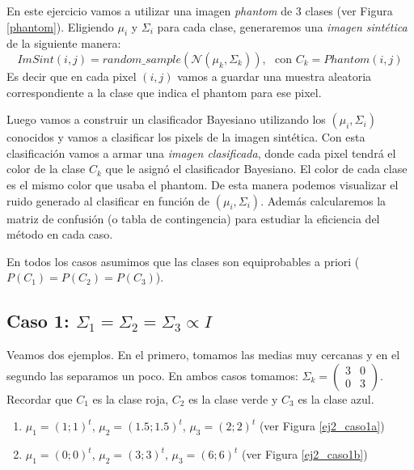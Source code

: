 \documentclass[a4paper,11pt]{article}
\begin{document}
En este ejercicio vamos a utilizar una imagen \emph{phantom} de 3 clases (ver Figura \ref{phantom}). Eligiendo $\mu_i$ y $\Sigma_i$ para cada clase,
generaremos una \emph{imagen sintética} de la siguiente manera:
$$ ImSint(i,j) = random\_sample(\mathcal{N}(\mu_k, \Sigma_k)), \ \ \ \text{con } C_k = Phantom(i,j)$$
Es decir que en cada pixel $(i,j)$ vamos a guardar una muestra aleatoria correspondiente a la clase que indica el phantom para ese pixel.

Luego vamos a construir un clasificador Bayesiano utilizando los $(\mu_i, \Sigma_i)$ conocidos y vamos a clasificar los pixels de la imagen sintética.
Con esta clasificación vamos a armar una \emph{imagen clasificada}, donde cada pixel tendrá el color de la clase $C_k$ que le asignó el clasificador Bayesiano. El color de cada clase es el mismo color que usaba el phantom. De esta manera podemos visualizar el ruido generado al clasificar en función de $(\mu_i, \Sigma_i)$. Además calcularemos la matriz de confusión (o tabla de contingencia) para estudiar la eficiencia del método en cada caso.

En todos los casos asumimos que las clases son equiprobables a priori ($P(C_1) = P(C_2) = P(C_3)$).

\subsection*{Caso 1: $\Sigma_1 = \Sigma_2 = \Sigma_3 \propto I$}
Veamos dos ejemplos. En el primero, tomamos las medias muy cercanas y en el segundo las separamos un poco. En ambos casos tomamos:
$\Sigma_k = \begin{pmatrix}3 & 0\\ 0 & 3\end{pmatrix}$. Recordar que $C_1$ es la clase roja, $C_2$ es la clase verde y $C_3$ es la clase azul.
\begin{enumerate}
  \item $\mu_1 = (1;1)^t$, $\mu_2 = (1.5; 1.5)^t$, $\mu_3 = (2;2)^t$ (ver Figura \ref{ej2_caso1a})
  \item $\mu_1 = (0;0)^t$, $\mu_2 = (3; 3)^t$, $\mu_3 = (6;6)^t$ (ver Figura \ref{ej2_caso1b})
\end{enumerate}
\end{document}
